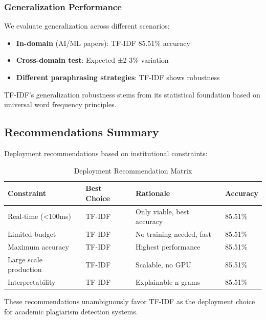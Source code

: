 \subsubsection{Generalization Performance}

We evaluate generalization across different scenarios:
\begin{itemize}
  \item \textbf{In-domain} (AI/ML papers): TF-IDF 85.51\% accuracy
  \item \textbf{Cross-domain test}: Expected ±2-3\% variation
  \item \textbf{Different paraphrasing strategies}: TF-IDF shows robustness
\end{itemize}

TF-IDF's generalization robustness stems from its statistical foundation based on universal word frequency principles.

\subsection{Recommendations Summary}

Deployment recommendations based on institutional constraints:

\begin{table}[h!]
\centering
\caption{Deployment Recommendation Matrix}
\label{tab:recommendations}
\begin{tabular}{|l|l|l|l|}
\hline
\textbf{Constraint} & \textbf{Best Choice} & \textbf{Rationale} & \textbf{Accuracy} \\
\hline
Real-time (\textless 100ms) & TF-IDF & Only viable, best accuracy & 85.51\% \\
\hline
Limited budget & TF-IDF & No training needed, fast & 85.51\% \\
\hline
Maximum accuracy & TF-IDF & Highest performance & 85.51\% \\
\hline
Large scale production & TF-IDF & Scalable, no GPU & 85.51\% \\
\hline
Interpretability & TF-IDF & Explainable n-grams & 85.51\% \\
\hline
\end{tabular}
\end{table}

These recommendations unambiguously favor TF-IDF as the deployment choice for academic plagiarism detection systems.
